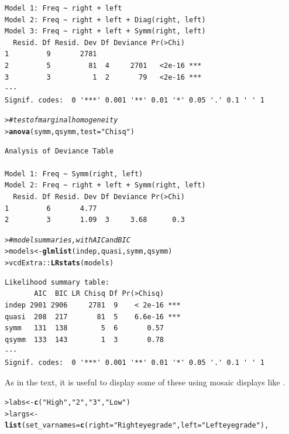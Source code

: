 \documentclass[10pt]{report}\usepackage[]{graphicx}\usepackage[]{color}
\makeatletter
\newcommand{\hlstr}[1]{\textcolor[rgb]{0.192,0.494,0.8}{#1}}%
\newcommand{\hlcom}[1]{\textcolor[rgb]{0.678,0.584,0.686}{\textit{#1}}}%
\newcommand{\hlopt}[1]{\textcolor[rgb]{0,0,0}{#1}}%
\newcommand{\hlstd}[1]{\textcolor[rgb]{0.345,0.345,0.345}{#1}}%
\newcommand{\hlkwb}[1]{\textcolor[rgb]{0.69,0.353,0.396}{#1}}%
\newcommand{\hlkwc}[1]{\textcolor[rgb]{0.333,0.667,0.333}{#1}}%
\newcommand{\hlkwd}[1]{\textcolor[rgb]{0.737,0.353,0.396}{\textbf{#1}}}%
\newenvironment{kframe}{%
 \def\at@end@of@kframe{}%
 \ifinner\ifhmode%
  \def\at@end@of@kframe{\end{minipage}}%
  \begin{minipage}{\columnwidth}%
 \fi\fi%
 \def\FrameCommand##1{\hskip\@totalleftmargin \hskip-\fboxsep
 \colorbox{shadecolor}{##1}\hskip-\fboxsep
     \hskip-\linewidth \hskip-\@totalleftmargin \hskip\columnwidth}%
 \MakeFramed {\advance\hsize-\width
   \@totalleftmargin\z@ \linewidth\hsize
   \@setminipage}}%
 {\par\unskip\endMakeFramed%
 \at@end@of@kframe}
\newenvironment{knitrout}{}{} %
\renewenvironment{knitrout}{\small\renewcommand{\baselinestretch}{.85}}{} %
\makeatother
\begin{document}
\begin{Exercises}
\begin{ans}
\begin{knitrout}
\begin{kframe}
\begin{verbatim}
Model 1: Freq ~ right + left
Model 2: Freq ~ right + left + Diag(right, left)
Model 3: Freq ~ right + left + Symm(right, left)
  Resid. Df Resid. Dev Df Deviance Pr(>Chi)    
1         9       2781                         
2         5         81  4     2701   <2e-16 ***
3         3          1  2       79   <2e-16 ***
---
Signif. codes:  0 '***' 0.001 '**' 0.01 '*' 0.05 '.' 0.1 ' ' 1
\end{verbatim}
\begin{alltt}
\hlstd{> }  \hlcom{# test of marginal homogeneity}
\hlstd{> }\hlkwd{anova}\hlstd{(symm, qsymm,} \hlkwc{test}\hlstd{=}\hlstr{"Chisq"}\hlstd{)}
\end{alltt}
\begin{verbatim}
Analysis of Deviance Table

Model 1: Freq ~ Symm(right, left)
Model 2: Freq ~ right + left + Symm(right, left)
  Resid. Df Resid. Dev Df Deviance Pr(>Chi)
1         6       4.77                     
2         3       1.09  3     3.68      0.3
\end{verbatim}
\begin{alltt}
\hlstd{> }  \hlcom{# model summaries, with AIC and BIC}
\hlstd{> }\hlstd{models} \hlkwb{<-} \hlkwd{glmlist}\hlstd{(indep, quasi, symm, qsymm)}
\hlstd{> }\hlstd{vcdExtra}\hlopt{::}\hlkwd{LRstats}\hlstd{(models)}
\end{alltt}
\begin{verbatim}
Likelihood summary table:
       AIC  BIC LR Chisq Df Pr(>Chisq)    
indep 2901 2906     2781  9    < 2e-16 ***
quasi  208  217       81  5    6.6e-16 ***
symm   131  138        5  6       0.57    
qsymm  133  143        1  3       0.78    
---
Signif. codes:  0 '***' 0.001 '**' 0.01 '*' 0.05 '.' 0.1 ' ' 1
\end{verbatim}
\end{kframe}
\end{knitrout}
  As in the text, it is useful to display some of these using mosaic displays like .
\begin{knitrout}\footnotesize
{}\color{fgcolor}\begin{kframe}
\begin{alltt}
\hlstd{> }\hlstd{labs} \hlkwb{<-} \hlkwd{c}\hlstd{(}\hlstr{"High"}\hlstd{,} \hlstr{"2"}\hlstd{,} \hlstr{"3"}\hlstd{,} \hlstr{"Low"}\hlstd{)}
\hlstd{> }\hlstd{largs} \hlkwb{<-} \hlkwd{list}\hlstd{(}\hlkwc{set_varnames} \hlstd{=} \hlkwd{c}\hlstd{(}\hlkwc{right}\hlstd{=}\hlstr{"Right eye grade"}\hlstd{,} \hlkwc{left}\hlstd{=}\hlstr{"Left eye grade"}\hlstd{),}

\end{alltt}
\end{kframe}
\end{knitrout}
\end{ans}
\end{Exercises}
\end{document}
